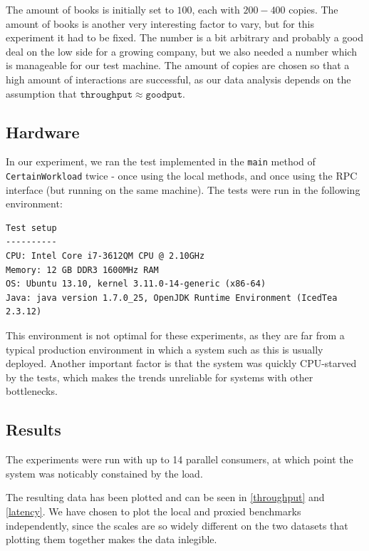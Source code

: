 \documentclass[11pt,a4paper]{article}
\begin{document}
The amount of books is initially set to $100$, each with $200-400$ copies.
The amount of books is another very interesting factor to vary, but for this
experiment it had to be fixed. The number is a bit arbitrary and probably a
good deal on the low side for a growing company, but we also needed a number
which is manageable for our test machine. The amount of copies are chosen so
that a high amount of interactions are successful, as our data analysis depends
on the assumption that $\mathtt{throughput} \approx \mathtt{goodput}$.

\subsection*{Hardware}
In our experiment, we ran the test implemented in the \texttt{main} method of
\texttt{CertainWorkload} twice - once using the local methods, and once using
the RPC interface (but running on the same machine). The tests were run in the
following environment:

\begin{verbatim}
Test setup
----------
CPU: Intel Core i7-3612QM CPU @ 2.10GHz
Memory: 12 GB DDR3 1600MHz RAM
OS: Ubuntu 13.10, kernel 3.11.0-14-generic (x86-64) 
Java: java version 1.7.0_25, OpenJDK Runtime Environment (IcedTea 2.3.12)
\end{verbatim}

This environment is not optimal for these experiments, as they are far from
a typical production environment in which a system such as this is usually
deployed. Another important factor is that the system was quickly CPU-starved
by the tests, which makes the trends unreliable for systems with other
bottlenecks.

\subsection*{Results}
The experiments were run with up to 14 parallel consumers, at which point the
system was noticably constained by the load.

The resulting data has been plotted and can be seen in \autoref{throughput}
and \autoref{latency}. We have chosen to plot the local and proxied benchmarks
independently, since the scales are so widely different on the two datasets
that plotting them together makes the data inlegible.
\end{document}
